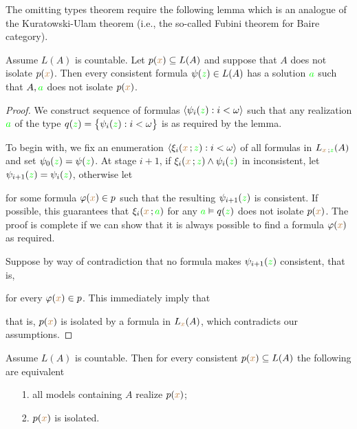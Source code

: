 \documentclass[creche.tex]{subfiles}
\begin{document}
The omitting types theorem require the following lemma which is an analogue of the Kura\-towski-Ulam theorem (i.e., the so-called Fubini theorem for Baire category).

\begin{lemma}\label{lem_kuratowskiUlam}
Assume $L(A)$ is countable. Let $p({\color{brown} x})\subseteq L(A)$ and suppose that $A$ does not isolate $p({\color{brown} x})$. Then every consistent formula $\psi({\color{green} z})\in L(A)$ has a solution ${\color{green} a}$ such that $A,{\color{green} a}$ does not isolate $p({\color{brown} x})$.
\end{lemma}
\begin{proof}
We construct sequence of formulas $\langle\psi_i({\color{green} z}):i<\omega\rangle$ such that any realization ${\color{green} a}$ of the type  $q({\color{green} z})=\big\{\psi_i({\color{green} z}):i<\omega\big\}$ is as required by the lemma.

To begin with, we fix an enumeration $\langle\xi_i({\color{brown} x}\,;{\color{green} z}):i<\omega\rangle$ of all formulas in $L_{{\color{brown} x}\,;{\color{green} z}}(A)$ and set $\psi_0({\color{green} z})= \psi({\color{green} z})$. At stage $i+1$, if $\xi_i({\color{brown} x}\,;{\color{green} z})\wedge\psi_i({\color{green} z})$ in inconsistent, let $\psi_{i+1}({\color{green} z})=\psi_i({\color{green} z})$, otherwise let

 
for some formula $\varphi({\color{brown} x})\in p$ such that the resulting $\psi_{i+1}({\color{green} z})$ is consistent. If possible, this guarantees that $\xi_i({\color{brown} x}\,;{\color{green} a})$ for any ${\color{green} a}\vDash q({\color{green} z})$ does not isolate $p({\color{brown} x})$. The proof is complete if we can show that it is always possible to find a formula $\varphi({\color{brown} x})$ as required. 

Suppose by way of contradiction that no formula makes $\psi_{i+1}({\color{green} z})$ consistent, that is, 


for every $\varphi({\color{brown} x})\in p$. This immediately imply that 



that is, $p({\color{brown} x})$ is isolated by a formula in $L_{{\color{brown} x}}(A)$, which contradicts our assumptions.
\end{proof}

\begin{theorem} Assume $L(A)$ is countable. Then for every consistent $p({\color{brown} x})\subseteq L(A)$ the following are equivalent
\begin{itemize}   
\item[1.] all models containing $A$ realize $p({\color{brown} x})$;
\item[2.] $p({\color{brown} x})$ is isolated.
\end{itemize}
\end{theorem}
\end{document}
